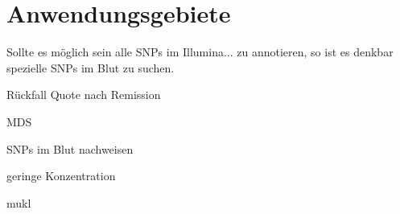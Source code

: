 \section{Anwendungsgebiete}

Sollte es möglich sein alle \ac{SNP}s im Illumina... zu annotieren, so ist es denkbar spezielle SNPs im Blut zu suchen.


Rückfall Quote nach Remission

MDS

SNPs im Blut nachweisen

geringe Konzentration



mukl